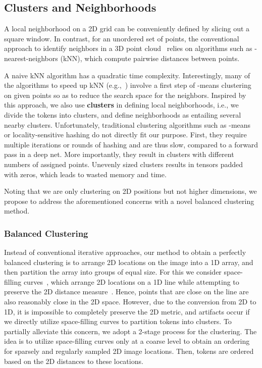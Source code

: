 \documentclass[10pt,twocolumn,letterpaper]{article}
\begin{document}
\subsection{Clusters and Neighborhoods}\label{sec:cluster}

A local neighborhood on a 2D grid can be conveniently defined by slicing out a square window. In contrast, for an unordered set of points, the conventional approach to identify neighbors in a 3D point cloud~\cite{pointnet++,pointconv} relies on algorithms such as -nearest-neighbors (kNN), which compute pairwise distances between points.

A naive kNN algorithm has a quadratic time complexity. Interestingly, many of the algorithms to speed up kNN (e.g.,~\cite{faiss}) involve a first step of -means clustering on given points so as to reduce the search space for the neighbors. 
Inspired by this approach, we also use 
\textbf{clusters} in defining local neighborhoods, i.e., we  
divide the tokens into clusters, and define neighborhoods as entailing several nearby clusters. Unfortunately, traditional clustering algorithms such as -means or locality-sensitive hashing do not directly fit our purpose. First, they require multiple iterations or rounds of hashing and are thus slow, compared to a forward pass in a deep net. More importantly, they result in clusters with different numbers of assigned points. Unevenly sized clusters results in tensors padded with zeros, which leads to wasted memory and time. 

Noting that we are only clustering on 2D positions but not higher dimensions, we propose to address the aforementioned concerns with a novel balanced clustering method.

\subsubsection{Balanced Clustering}
Instead of conventional iterative approaches, our method to obtain a perfectly balanced clustering is to arrange 2D locations on the image 
into a 1D array, and then partition the array into groups of equal size. For this we consider space-filling curves~\cite{peano}, which arrange 2D locations on a 1D line while attempting to preserve the 2D distance measure~\cite{moon2001analysis}. Hence, points that are close on the line are also reasonably close in the 2D space. However, due to the conversion from 2D to 1D, it is impossible to completely preserve the 2D metric, and artifacts occur if we directly utilize space-filling curves to partition tokens into clusters. To partially alleviate this concern, we adopt a 2-stage process for the clustering. The idea is to utilize space-filling curves only at a coarse level to obtain an ordering for sparsely and regularly sampled 2D image locations. Then, tokens are ordered based on the 2D distances to these locations.
\end{document}

